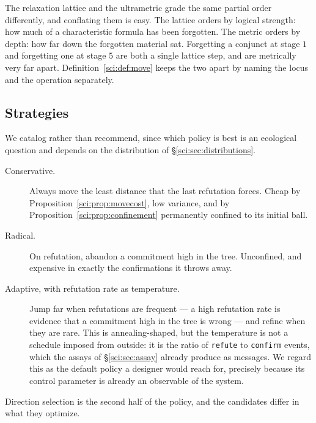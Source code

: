 \begin{remark}
\label{sci:rem:twogradings}
The relaxation lattice and the ultrametric grade the same partial order differently, and conflating
them is easy. The lattice orders by logical strength: how much of a characteristic formula has been
forgotten. The metric orders by depth: how far down the forgotten material sat. Forgetting a conjunct
at stage $1$ and forgetting one at stage $5$ are both a single lattice step, and are metrically very
far apart. Definition~\ref{sci:def:move} keeps the two apart by naming the locus and the operation
separately.
\end{remark}

\subsection{Strategies}\label{sci:S6.3}

We catalog rather than recommend, since which policy is best is an ecological question and depends on
the distribution of \S\ref{sci:sec:distributions}.

\begin{description}
\item[Conservative.] Always move the least distance that the last refutation forces. Cheap by
Proposition~\ref{sci:prop:movecost}, low variance, and by Proposition~\ref{sci:prop:confinement} permanently
confined to its initial ball.

\item[Radical.] On refutation, abandon a commitment high in the tree. Unconfined, and expensive in
exactly the confirmations it throws away.

\item[Adaptive, with refutation rate as temperature.] Jump far when refutations are frequent --- a
high refutation rate is evidence that a commitment high in the tree is wrong --- and refine when they
are rare. This is annealing-shaped, but the temperature is not a schedule imposed from outside: it is
the ratio of \texttt{refute} to \texttt{confirm} events, which the assays of \S\ref{sci:sec:assay} already
produce as messages. We regard this as the default policy a designer would reach for, precisely
because its control parameter is already an observable of the system.
\end{description}

Direction selection is the second half of the policy, and the candidates differ in what they optimize.

